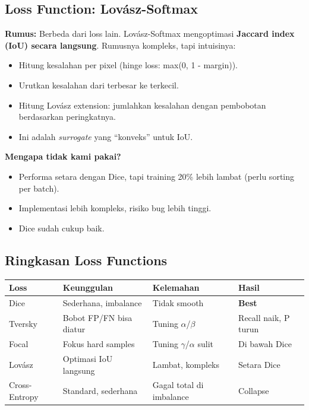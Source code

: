 \documentclass[10pt,a4paper,onecolumn]{article}
\begin{document}
\subsection{Loss Function: Lov\'asz-Softmax}

\textbf{Rumus:} Berbeda dari loss lain. Lov\'asz-Softmax mengoptimasi
\textbf{Jaccard index (IoU) secara langsung}. Rumusnya kompleks,
tapi intuisinya:

\begin{itemize}[nosep]
    \item Hitung kesalahan per pixel (hinge loss: max(0, 1 - margin)).
    \item Urutkan kesalahan dari terbesar ke terkecil.
    \item Hitung Lov\'asz extension: jumlahkan kesalahan dengan
          pembobotan berdasarkan peringkatnya.
    \item Ini adalah \textit{surrogate} yang ``konveks'' untuk IoU.
\end{itemize}

\textbf{Mengapa tidak kami pakai?}
\begin{itemize}[nosep]
    \item Performa setara dengan Dice, tapi training 20\% lebih
          lambat (perlu sorting per batch).
    \item Implementasi lebih kompleks, risiko bug lebih tinggi.
    \item Dice sudah cukup baik.
\end{itemize}

\subsection{Ringkasan Loss Functions}

\begin{table}[ht]
\centering
\small
\begin{tabular}{llll}
\toprule
\textbf{Loss} & \textbf{Keunggulan} & \textbf{Kelemahan} & \textbf{Hasil} \\
\midrule
Dice & Sederhana, imbalance & Tidak smooth & \textbf{Best} \\
Tversky & Bobot FP/FN bisa diatur & Tuning $\alpha$/$\beta$ & Recall naik, P turun \\
Focal & Fokus hard samples & Tuning $\gamma$/$\alpha$ sulit & Di bawah Dice \\
Lov\'asz & Optimasi IoU langsung & Lambat, kompleks & Setara Dice \\
Cross-Entropy & Standard, sederhana & Gagal total di imbalance & Collapse \\
\bottomrule
\end{tabular}
\end{table}
\end{document}
